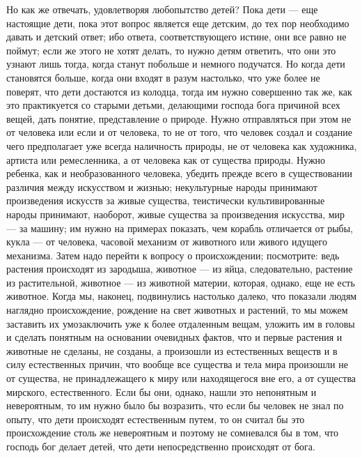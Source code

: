 \documentclass[12pt]{article}
\begin{document}
Но как же отвечать, удовлетворяя любопытство детей? Пока дети --- еще настоящие дети, пока этот вопрос является еще детским, до тех пор необходимо давать и детский ответ; ибо ответа, соответствующего истине, они все равно не поймут; если же этого не хотят делать, то нужно детям ответить, что они это узнают лишь тогда, когда станут побольше и немного подучатся. Но когда дети становятся больше, когда они входят в разум настолько, что уже более не поверят, что дети достаются из колодца, тогда им нужно совершенно так же, как это практикуется со старыми детьми, делающими господа бога причиной всех вещей, дать понятие, представление о природе. Нужно отправляться при этом не от человека или если и от человека, то не от того, что человек создал и создание чего предполагает уже всегда наличность природы, не от человека как художника, артиста или ремесленника, а от человека как от существа природы. Нужно ребенка, как и необразованного человека, убедить прежде всего в существовании различия между искусством и жизнью; некультурные народы принимают произведения искусств за живые существа, теистически культивированные народы принимают, наоборот, живые существа за произведения искусства, мир --- за машину; им нужно на примерах показать, чем корабль отличается от рыбы, кукла --- от человека, часовой механизм от животного или живого идущего механизма. Затем надо перейти к вопросу о происхождении; посмотрите: ведь растения происходят из зародыша, животное --- из яйца, следовательно, растение из растительной, животное --- из животной материи, которая, однако, еще не есть животное. Когда мы, наконец, подвинулись настолько далеко, что показали людям наглядно происхождение, рождение на свет животных и растений, то мы можем заставить их умозаключить уже к более отдаленным вещам, уложить им в головы и сделать понятным на основании очевидных фактов, что и первые растения и животные не сделаны, не созданы, а произошли из естественных веществ и в силу естественных причин, что вообще все существа и тела мира произошли не от существа, не принадлежащего к миру или находящегося вне его, а от существа мирского, естественного. Если бы они, однако, нашли это непонятным и невероятным, то им нужно было бы возразить, что если бы человек не знал по опыту, что дети происходят естественным путем, то он считал бы это происхождение столь же невероятным и поэтому не сомневался бы в том, что господь бог делает детей, что дети непосредственно происходят от бога. 
\end{document}
